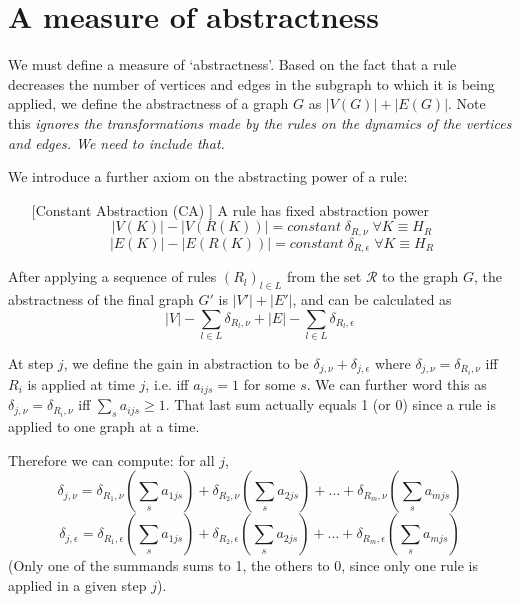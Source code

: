 \documentclass[11pt, oneside, reqno]{article}
\newcommand{\Rc}{\mathcal{R}}
\begin{document}
\section{A measure of abstractness}
We must define a measure of `abstractness'.
Based on the fact that a rule decreases the number of vertices and edges in the subgraph to which it is being applied, we define the abstractness of a graph $G$ as $|V(G)|+|E(G)|$.
Note this \emph{ignores the transformations made by the rules on the dynamics of the vertices and edges. We need to include that.}

We introduce a further axiom on the abstracting power of a rule:
\begin{enumerate}
	\item [[Constant Abstraction (CA)]] A rule has fixed abstraction power
	\[|V(K)| - |V(R(K))| = constant\; \delta_{R,\nu}\; \forall K \equiv H_R\] 
	\[|E(K)| - |E(R(K))| = constant\; \delta_{R,\epsilon}\; \forall K \equiv H_R\] 	
\end{enumerate}

After applying a sequence of rules $(R_l)_{l\in L}$ from the set $\Rc$ to the graph $G$, the abstractness of the final graph $G'$ is $|V'|+|E'|$, and can be calculated as 
\[|V|-\sum_{l \in L}\delta_{R_l,\nu} + |E| - \sum_{l \in L} \delta_{R_l,\epsilon}\]

At step $j$, we define the gain in abstraction to be $\delta_{j,\nu}+\delta_{j,\epsilon}$ where $\delta_{j,\nu}=\delta_{R_i,\nu}$ iff $R_i$ is applied at time $j$, i.e. iff $a_{ijs}=1$ for some $s$. 
We can further word this as $\delta_{j,\nu}=\delta_{R_i,\nu}$ iff $\sum_{s}a_{ijs}\geq 1$.
That last sum actually equals 1 (or 0) since a rule is applied to one graph at a time.

Therefore we can compute: for all $j$,
\begin{equation}
\label{eq:deltav}
\delta_{j,\nu} = \delta_{R_1,\nu} \left(\sum_{s}a_{1js}\right) + \delta_{R_2,\nu}\left(\sum_{s}a_{2js}\right) + \ldots + \delta_{R_m,\nu} \left(\sum_{s}a_{mjs} \right)
\end{equation}
\begin{equation}
\label{eq:deltae}
\delta_{j,\epsilon} = \delta_{R_1,\epsilon} \left(\sum_{s}a_{1js}\right) + \delta_{R_2,\epsilon}\left(\sum_{s}a_{2js}\right) + \ldots + \delta_{R_m,\epsilon} \left(\sum_{s}a_{mjs} \right)
\end{equation}
(Only one of the summands sums to 1, the others to 0, since only one rule is applied in a given step $j$).
\end{document}
